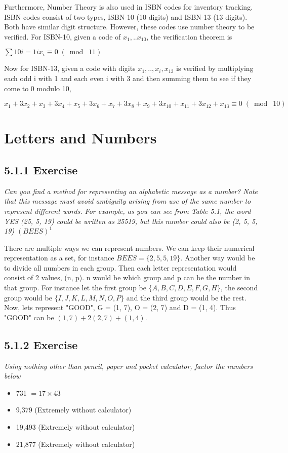 \documentclass{article}
\begin{document}
Furthermore, Number Theory is also used in ISBN codes for inventory tracking. ISBN codes consist of two types, ISBN-10 (10 digits) and ISBN-13 (13 digits). Both have similar digit structure. However, these codes use number theory to be verified. For ISBN-10, given a code of $x_1,..x_10$, the verification theorem is
\begin{center}
    $\sum{10}{i = 1} ix_i \equiv 0 \;(\bmod\; 11)$
\end{center}

Now for ISBN-13, given a code with digits $x_1,..,x_i,x_13$ is verified by multiplying each odd i with 1 and each even i with 3 and then summing them to see if they come to 0 modulo 10,
\begin{center}
    $x_1 + 3x_2 + x_3 + 3x_4 + x_5 + 3x_6 + x_7 + 3x_8 + x_9 + 3x_10 + x_11 + 3x_12 + x_13 \equiv 0 \;(\bmod\; 10)$
\end{center}

\section*{Letters and Numbers}

\subsection*{5.1.1 Exercise}
\quad \textit{Can you find a method for representing an alphabetic message as a
number? Note that this message must avoid ambiguity arising from use of the same
number to represent different words. For example, as you can see from Table 5.1,
the word YES (25, 5, 19) could be written as 25519, but this number could also be
(2, 5, 5, 19) $(BEES)^1$}

There are multiple ways we can represent numbers. We can keep their numerical representation as a set, for instance $BEES = \{2, 5, 5, 19\}$. Another way would be to divide all numbers in each group. Then each letter representation would consist of 2 values, (n, p). n would be which group and p can be the number in that group. For instance let the first group be $\{A, B, C, D, E, F, G, H\}$, the second group would be $\{I, J, K, L, M, N, O, P\}$ and the third group would be the rest. Now, lets represent "GOOD", G = (1, 7), O = (2, 7) and D = (1, 4). Thus "GOOD" can be $(1,7) + 2(2,7) + (1,4)$.

\subsection*{5.1.2 Exercise}
\quad \textit{Using nothing other than pencil, paper and pocket calculator, factor
the numbers below}
\begin{itemize}
    \item 731 $= 17 \times 43$
    \item 9,379 (Extremely without calculator)
    \item 19,493 (Extremely without calculator)
    \item 21,877 (Extremely without calculator)
\end{itemize}
\end{document}
